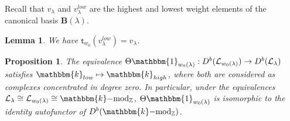 \documentclass[11pt,reqno]{amsart}
\numberwithin{equation}{section}
\newtheorem{Proposition}[equation]{Proposition}
\newtheorem{Lemma}[equation]{Lemma}
\theoremstyle{definition}
\theoremstyle{named}
\newcommand{\bB}{\mathbf{B}}
\newcommand{\cL}{\mathcal{L}}
\newcommand{\kk}{\mathbbm{k}}
\newcommand{\st}{\mathsf{t}}
\newcommand{\ZZ}{\mathbb{Z}}
\newcommand{\bone}{\mathbbm{1}}
\newcommand{\mmod}{\mathrm{-mod}}
\begin{document}
Recall that $v_\lambda$ and $v_\lambda^{low}$ are the highest and lowest weight elements of the canonical basis $\bB(\lambda)$.

\begin{Lemma}\cite[Comment 5.10]{KT}\label{lemma:KT}
We have $\st_{w_0}(v_\lambda^{low})=v_\lambda$.
\end{Lemma}

\begin{Proposition}\label{prop:lowestwt}
The equivalence $\Theta\bone_{w_0(\lambda)}:D^b(\cL_{w_0(\lambda)})\to D^b(\cL_{\lambda})$ satisfies $\kk_{low}\mapsto\kk_{high}$, where both are considered as complexes concentrated in degree zero.  In particular, under the equivalences $\cL_\lambda \cong \cL_{w_0(\lambda)}\cong \kk\mmod_\ZZ$,  $\Theta\bone_{w_0(\lambda)}$ is isomorphic to the identity autofunctor of $D^b(\kk\mmod_\ZZ)$.
\end{Proposition}
\end{document}
